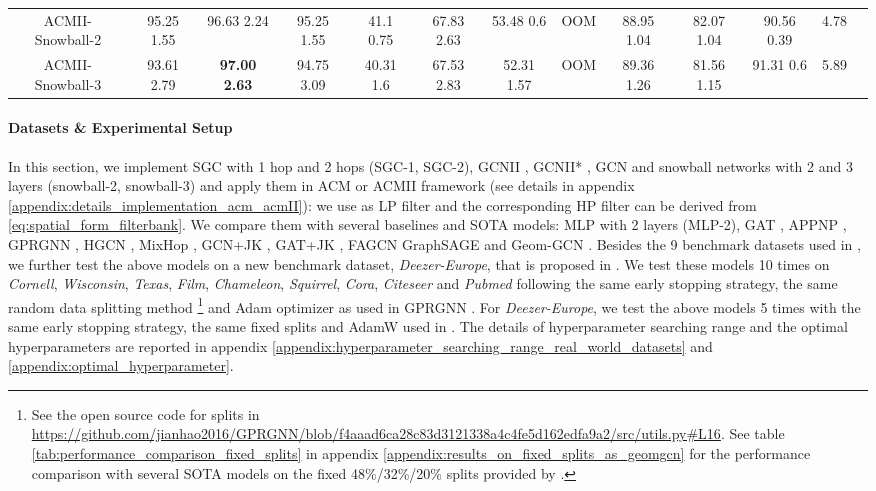 \documentclass{article}
\newcommand{\0}{{\boldsymbol{0}}}
\newcommand{\6}{{\partial}}
\newcommand{\8}{{\infty}}
\newcommand{\4}{{\nabla}}
\begin{document}
\begin{table}[htbp]
\begin{tabular}{c|cccccccccc|cc}
    ACMII-Snowball-2 & 95.25  1.55 & 96.63  2.24 & 95.25  1.55 & 41.1  0.75 & 67.83  2.63 & 53.48  0.6 & OOM   & 88.95  1.04 & 82.07  1.04 & 90.56  0.39 & 4.78 \\
    ACMII-Snowball-3 & 93.61  2.79 & \cellcolor[rgb]{ .816,  .808,  .808}\textbf{97.00  2.63} & 94.75  3.09 & 40.31  1.6 & 67.53  2.83 & 52.31  1.57 & OOM   & 89.36  1.26 & 81.56  1.15 & 91.31  0.6 & 5.89 \\
    \bottomrule
    \bottomrule
    \end{tabular}\label{tab:sota}\end{table} \paragraph{Datasets \& Experimental Setup}
In this section, we implement SGC \cite{wu2019simplifying} with 1 hop and 2 hops (SGC-1, SGC-2), GCNII \cite{chen2020simple}, GCNII* \cite{chen2020simple}, GCN \cite{kipf2016classification} and snowball networks with 2 and 3 layers (snowball-2, snowball-3) and apply them in ACM or ACMII framework (see details in appendix \ref{appendix:details_implementation_acm_acmII}): we use  as LP filter and the corresponding HP filter can be derived from \eqref{eq:spatial_form_filterbank}. We compare them with several baselines and SOTA models: MLP with 2 layers (MLP-2), GAT \cite{velivckovic2017attention},  APPNP \cite{klicpera2018predict}, GPRGNN \cite{chien2021adaptive}, HGCN \cite{zhu2020beyond}, MixHop \cite{abu2019mixhop}, GCN+JK \cite{kipf2016classification, pmlr-v80-xu18c, lim2021new}, GAT+JK \cite{velivckovic2017attention, pmlr-v80-xu18c, lim2021new}, FAGCN \cite{bo2021beyond} GraphSAGE \cite{hamilton2017inductive} and Geom-GCN \cite{pei2020geom}. Besides the 9 benchmark datasets used in \cite{pei2020geom}, we further test the above models on a new benchmark dataset, \textit{Deezer-Europe}, that is proposed in \cite{lim2021new}.
We test these models 10 times on \textit{Cornell}, \textit{Wisconsin}, \textit{Texas}, \textit{Film}, \textit{Chameleon}, \textit{Squirrel}, \textit{Cora}, \textit{Citeseer} and \textit{Pubmed} following the same early stopping strategy, the same random data splitting method \footnote{See the open source code for splits in \url{https://github.com/jianhao2016/GPRGNN/blob/f4aaad6ca28c83d3121338a4c4fe5d162edfa9a2/src/utils.py\#L16}. See table \ref{tab:performance_comparison_fixed_splits} in appendix \ref{appendix:results_on_fixed_splits_as_geomgcn} for the performance comparison with several SOTA models on the fixed 48\%/32\%/20\% splits provided by \cite{pei2020geom}.} and Adam \cite{kingma2014adam} optimizer as used in GPRGNN \cite{chien2021adaptive}.  For \textit{Deezer-Europe}, we test the above models 5 times with the same early stopping strategy, the same fixed splits and AdamW \cite{loshchilov2017decoupled} used in \cite{lim2021new}. The details of hyperparameter searching range and the optimal hyperparameters are reported in appendix \ref{appendix:hyperparameter_searching_range_real_world_datasets} and \ref{appendix:optimal_hyperparameter}. 
\end{document}

